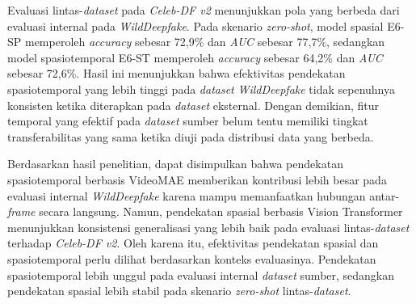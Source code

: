 \begin{center}
	Evaluasi lintas-\textit{dataset} pada \textit{Celeb-DF v2} menunjukkan pola yang berbeda dari evaluasi internal pada \textit{WildDeepfake}. Pada skenario \textit{zero-shot}, model spasial E6-SP memperoleh \textit{accuracy} sebesar 72,9\% dan \textit{AUC} sebesar 77,7\%, sedangkan model spasiotemporal E6-ST memperoleh \textit{accuracy} sebesar 64,2\% dan \textit{AUC} sebesar 72,6\%. Hasil ini menunjukkan bahwa efektivitas pendekatan spasiotemporal yang lebih tinggi pada \textit{dataset} \textit{WildDeepfake} tidak sepenuhnya konsisten ketika diterapkan pada \textit{dataset} eksternal. Dengan demikian, fitur temporal yang efektif pada \textit{dataset} sumber belum tentu memiliki tingkat transferabilitas yang sama ketika diuji pada distribusi data yang berbeda. \par

	Berdasarkan hasil penelitian, dapat disimpulkan bahwa pendekatan spasiotemporal berbasis VideoMAE memberikan kontribusi lebih besar pada evaluasi internal \textit{WildDeepfake} karena mampu memanfaatkan hubungan antar-\textit{frame} secara langsung. Namun, pendekatan spasial berbasis Vision Transformer menunjukkan konsistensi generalisasi yang lebih baik pada evaluasi lintas-\textit{dataset} terhadap \textit{Celeb-DF v2}. Oleh karena itu, efektivitas pendekatan spasial dan spasiotemporal perlu dilihat berdasarkan konteks evaluasinya. Pendekatan spasiotemporal lebih unggul pada evaluasi internal \textit{dataset} sumber, sedangkan pendekatan spasial lebih stabil pada skenario \textit{zero-shot} lintas-\textit{dataset}. \par

	\vfill
	
\end{center}
\clearpage

